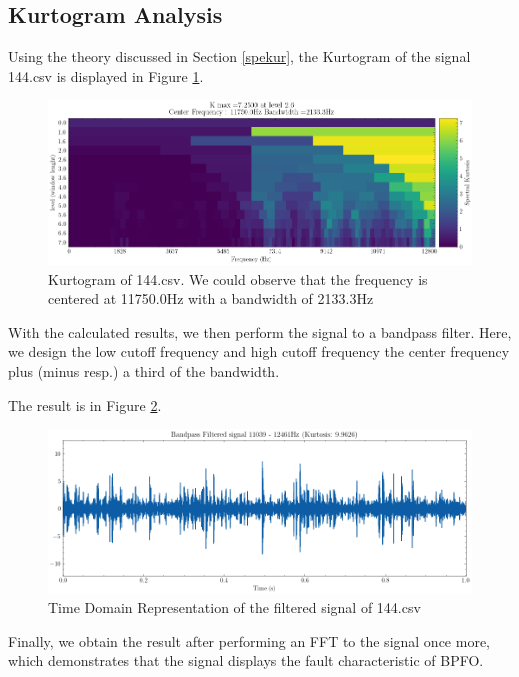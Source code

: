 \documentclass[conference]{IEEEtran}
\begin{document}
\subsection{Kurtogram Analysis}

Using the theory discussed in Section \ref{spekur}, the Kurtogram of the signal 144.csv is displayed in Figure \ref{fig_5}.

\begin{figure}[htbp]
    \centerline{\includegraphics[width=\textwidth]{figure/fig_5.png}}
    \caption{Kurtogram of 144.csv. We could observe that the frequency is centered at 11750.0Hz with a bandwidth of 2133.3Hz}
    \label{fig_5}
\end{figure}

With the calculated results, we then perform the signal to a bandpass filter. Here, we design the low cutoff frequency and high cutoff frequency the center frequency plus (minus resp.) a third of the bandwidth.

The result is in Figure \ref{fig_6}.

\begin{figure}[htbp]
    \centerline{\includegraphics[width=\textwidth]{figure/fig_6.png}}
    \caption{Time Domain Representation of the filtered signal of 144.csv}
    \label{fig_6}
\end{figure}

Finally, we obtain the result after performing an FFT to the signal once more, which demonstrates that the signal displays the fault characteristic of BPFO.
\end{document}

